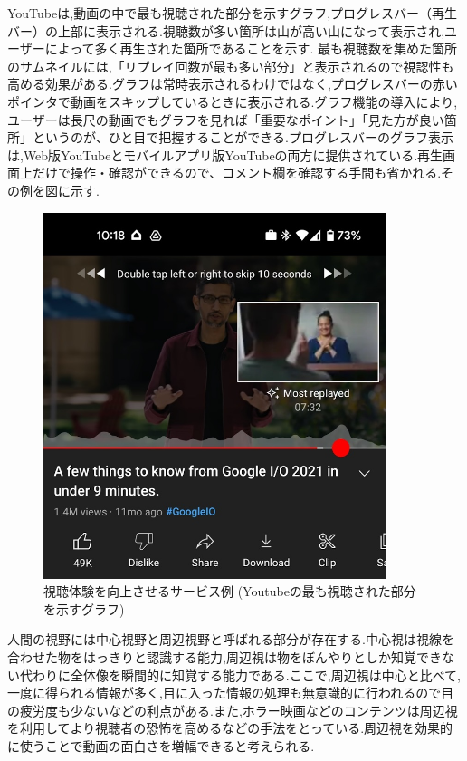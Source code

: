 YouTubeは,動画の中で最も視聴された部分を示すグラフ,プログレスバー（再生バー）の上部に表示される.視聴数が多い箇所は山が高い山になって表示され,ユーザーによって多く再生された箇所であることを示す.
最も視聴数を集めた箇所のサムネイルには,「リプレイ回数が最も多い部分」と表示されるので視認性も高める効果がある.グラフは常時表示されるわけではなく,プログレスバーの赤いポインタで動画をスキップしているときに表示される.グラフ機能の導入により,ユーザーは長尺の動画でもグラフを見れば「重要なポイント」「見た方が良い箇所」というのが、ひと目で把握することができる.プログレスバーのグラフ表示は,Web版YouTubeとモバイルアプリ版YouTubeの両方に提供されている.再生画面上だけで操作・確認ができるので、コメント欄を確認する手間も省かれる.その例を図に示す.
\begin{figure}[H]
    \centering
    \includegraphics[width=10cm]{images/chapter1/YouTube.jpeg}
    \caption{視聴体験を向上させるサービス例 (Youtubeの最も視聴された部分を示すグラフ)}
    \label{}
\end{figure}

人間の視野には中心視野と周辺視野と呼ばれる部分が存在する.中心視は視線を合わせた物をはっきりと認識する能力,周辺視は物をぼんやりとしか知覚できない代わりに全体像を瞬間的に知覚する能力である.ここで,周辺視は中心と比べて,一度に得られる情報が多く,目に入った情報の処理も無意識的に行われるので目の疲労度も少ないなどの利点がある.また,ホラー映画などのコンテンツは周辺視を利用してより視聴者の恐怖を高めるなどの手法をとっている.周辺視を効果的に使うことで動画の面白さを増幅できると考えられる.

